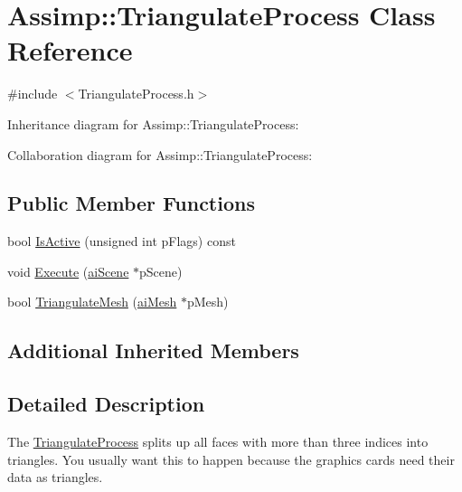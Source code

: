 \hypertarget{class_assimp_1_1_triangulate_process}{\section{Assimp\+:\+:Triangulate\+Process Class Reference}
\label{class_assimp_1_1_triangulate_process}
}


{\ttfamily \#include $<$Triangulate\+Process.\+h$>$}



Inheritance diagram for Assimp\+:\+:Triangulate\+Process\+:


Collaboration diagram for Assimp\+:\+:Triangulate\+Process\+:
\subsection*{Public Member Functions}
\begin{DoxyCompactItemize}
\item 
bool \hyperlink{class_assimp_1_1_triangulate_process_ad899db51582db4ff9213e1299518d129}{Is\+Active} (unsigned int p\+Flags) const 
\item 
void \hyperlink{class_assimp_1_1_triangulate_process_ac35ab886c3ca3b7b5bf5ca35c8a45429}{Execute} (\hyperlink{structai_scene}{ai\+Scene} $\ast$p\+Scene)
\item 
bool \hyperlink{class_assimp_1_1_triangulate_process_a2e91bcc01ea525013fd1f223db15134c}{Triangulate\+Mesh} (\hyperlink{structai_mesh}{ai\+Mesh} $\ast$p\+Mesh)
\end{DoxyCompactItemize}
\subsection*{Additional Inherited Members}


\subsection{Detailed Description}
The \hyperlink{class_assimp_1_1_triangulate_process}{Triangulate\+Process} splits up all faces with more than three indices into triangles. You usually want this to happen because the graphics cards need their data as triangles. 

